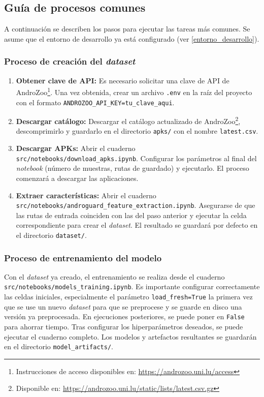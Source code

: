 \subsection{Guía de procesos comunes} \label{procesos_comunes}
A continuación se describen los pasos para ejecutar las tareas más comunes. Se asume que el entorno de desarrollo ya está configurado (ver \ref{entorno_desarrollo}).

\subsubsection{Proceso de creación del \textit{dataset}}
\begin{enumerate}
	\item \textbf{Obtener clave de API:} Es necesario solicitar una clave de API de AndroZoo\footnote{Instrucciones de acceso disponibles en: \url{https://androzoo.uni.lu/access}}. Una vez obtenida, crear un archivo \texttt{.env} en la raíz del proyecto con el formato \texttt{ANDROZOO\_API\_KEY=tu\_clave\_aqui}.
	
	\item \textbf{Descargar catálogo:} Descargar el catálogo actualizado de AndroZoo\footnote{Disponible en: \url{https://androzoo.uni.lu/static/lists/latest.csv.gz}}, descomprimirlo y guardarlo en el directorio \texttt{apks/} con el nombre \texttt{latest.csv}.
	
	\item \textbf{Descargar APKs:} Abrir el cuaderno \\\texttt{src/notebooks/download\_apks.ipynb}. Configurar los parámetros al final del \textit{notebook} (número de muestras, rutas de guardado) y ejecutarlo. El proceso comenzará a descargar las aplicaciones.
	
	\item \textbf{Extraer características:} Abrir el cuaderno \\\texttt{src/notebooks/androguard\_feature\_extraction.ipynb}. Asegurarse de que las rutas de entrada coinciden con las del paso anterior y ejecutar la celda correspondiente para crear el \textit{dataset}. El resultado se guardará por defecto en el directorio \texttt{dataset/}.
\end{enumerate}

\subsubsection{Proceso de entrenamiento del modelo}
Con el \textit{dataset} ya creado, el entrenamiento se realiza desde el cuaderno \texttt{src/notebooks/models\_training.ipynb}. Es importante configurar correctamente las celdas iniciales, especialmente el parámetro \texttt{load\_fresh=True} la primera vez que se use un nuevo \textit{dataset} para que se preprocese y se guarde en disco una versión ya preprocesada. En ejecuciones posteriores, se puede poner en \texttt{False} para ahorrar tiempo. Tras configurar los hiperparámetros deseados, se puede ejecutar el cuaderno completo. Los modelos y artefactos resultantes se guardarán en el directorio \texttt{model\_artifacts/}.


